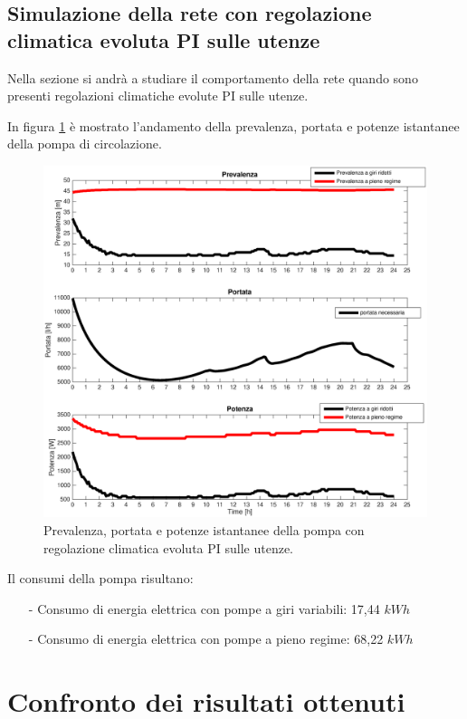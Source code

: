 \documentclass[laurea,oneside,11pt]{USiena_tesiLM}
\begin{document}
\subsection{Simulazione della rete con regolazione climatica evoluta PI sulle utenze}
Nella sezione si andrà a studiare il comportamento della rete quando sono presenti regolazioni climatiche evolute PI sulle utenze. 

In figura \ref{fig:sim_PID} è mostrato l'andamento della prevalenza, portata e potenze istantanee della pompa di circolazione.

\begin{figure}[!ht]
\centering
\includegraphics[width=\textwidth]{figure/sim_PID} 
\caption{Prevalenza, portata e potenze istantanee della pompa con regolazione climatica evoluta PI sulle utenze.}
\label{fig:sim_PID}
\end{figure}

Il consumi della pompa risultano:
\begin{itemize}
\item[-] Consumo di energia elettrica con pompe a giri variabili: 17,44 $kWh$ 
\item[-] Consumo di energia elettrica con pompe a pieno regime: 68,22 $kWh$
\end{itemize}

\section{Confronto dei risultati ottenuti}
\end{document}
